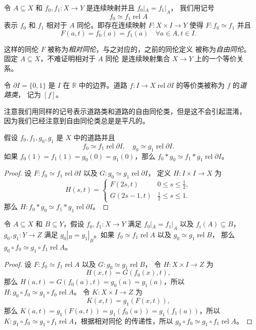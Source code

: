 \documentclass[fontset=none]{Notes}
\DeclareMathOperator\rel{rel}
\newcommand{\partI}{\partial I}
\newcommand{\relhomo}{\rel\partI}
\begin{document}
\begin{definition}
  令 $A\subseteq X$ 和 $f_0,f_1:X\to Y$ 是连续映射并且 $f_0|_A=f_1|_A$，
  我们用记号
  \[
    f_0\simeq f_1\rel A
  \]
  表示 $f_0$ 和 $f_1$ 相对于 $A$ 同伦。即存在连续映射
  $F:X\times I\to Y$ 使得 $F:f_0\simeq f_1$ 并且
  \[
    F(a,t)=f_0(a)=f_1(a)\quad \forall a\in A,t\in I.
  \] 
\end{definition}

这样的同伦 $F$ 被称为\emph{相对同伦}，与之对应的，之前的同伦定义
被称为\emph{自由同伦}。固定 $A\subseteq X$，不难证明相对于 $A$ 同伦
是连续映射集合 $X\to Y$ 上的一个等价关系。

\begin{definition}
  令 $\partI=\{0,1\}$ 是 $I$ 在 $\mathbb{R}$ 中的边界。道路
  $f:I\to X\rel\partI$ 的等价类被称为 $f$ 的\emph{道路类}，
  记为 $[f]$。
\end{definition}

注意我们用同样的记号表示道路类和道路的自由同伦类，但是这不会引起混淆，
因为我们已经注意到自由同伦类总是是平凡的。

\begin{theorem}
  假设 $f_0,f_1,g_0,g_1$ 是 $X$ 中的道路并且
  \[
    f_0\simeq f_1\relhomo,\quad g_0\simeq g_1\relhomo.
  \]
  如果 $f_0(1)=f_1(1)=g_0(0)=g_1(0)$，那么 $f_0*g_0\simeq f_1*g_1\relhomo$。
\end{theorem}
\begin{proof}
  设 $F:f_0\simeq f_1\relhomo$ 以及 $G:g_0\simeq g_1\relhomo$，
  定义 $H:I\times I\to X$ 为
  \[
    H(s,t)=\begin{cases}
      F(2s,t) & 0\leq s\leq \frac{1}{2},\\
      G(2s-1,t) & \frac{1}{2}\leq s\leq 1.
    \end{cases}
  \]
  那么 $H:f_0*g_0\simeq f_1*g_1\relhomo$。
\end{proof}

\begin{problem}{}{}
  令 $A\subseteq X$ 和 $B\subseteq Y$，假设 $f_0,f_1:X\to Y$
  满足 $f_0|_A=f_1|_A$ 以及 $f_i(A)\subseteq B$，$g_0,g_1:Y\to Z$
  满足 $g_0|_B=g_1|_B$。如果 $f_0\simeq f_1\rel A$ 以及 $g_0\simeq g_1\rel B$，
  那么 $g_0\circ f_0\simeq g_1\circ f_1\rel A$。
\end{problem}
\begin{proof}
  设 $F:f_0\simeq f_1\rel A$ 以及 $G:g_0\simeq g_1\rel B$，
  令 $H:X\times I\to Z$ 为
  \[
    H(x,t)=G(f_0(x),t),
  \]
  那么 $H(a,t)=G(f_0(a),t)=g_0(a)=g_1(a)$，所以 
  $H:g_0\circ f_0\simeq g_1\circ f_0\rel A$。
  令 $K:X\times I\to Z$ 为
  \[
    K(x,t)=g_1(F(x,t)),
  \]
  那么 $K(a,t)=g_1(F(a,t))=g_1(f_0(a))=g_1(f_1(a))$，所以
  $K:g_1\circ f_0\simeq g_1\circ f_1\rel A$，根据相对同伦
  的传递性，所以 $g_0\circ f_0\simeq g_1\circ f_1\rel A$。
\end{proof}
\end{document}
